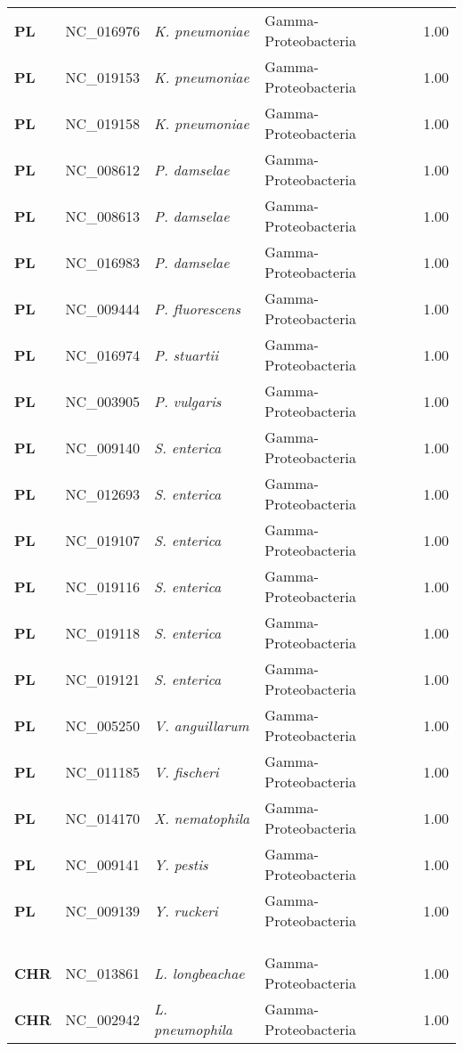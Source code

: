 \begin{adjustwidth}{-3cm}{2cm}
{\begin{supertabular}{>{\bfseries}l|p{0.1\textwidth}p{0.14\textwidth}l|l}
PL & NC\_016976 & \textit{K. pneumoniae} & Gamma-Proteobacteria & 1.00\\
PL & NC\_019153 & \textit{K. pneumoniae} & Gamma-Proteobacteria & 1.00\\
PL & NC\_019158 & \textit{K. pneumoniae} & Gamma-Proteobacteria & 1.00\\
PL & NC\_008612 & \textit{P. damselae} & Gamma-Proteobacteria & 1.00\\
PL & NC\_008613 & \textit{P. damselae} & Gamma-Proteobacteria & 1.00\\
PL & NC\_016983 & \textit{P. damselae} & Gamma-Proteobacteria & 1.00\\
PL & NC\_009444 & \textit{P. fluorescens} & Gamma-Proteobacteria & 1.00\\
PL & NC\_016974 & \textit{P. stuartii} & Gamma-Proteobacteria & 1.00\\
PL & NC\_003905 & \textit{P. vulgaris} & Gamma-Proteobacteria & 1.00\\
PL & NC\_009140 & \textit{S. enterica} & Gamma-Proteobacteria & 1.00\\
PL & NC\_012693 & \textit{S. enterica} & Gamma-Proteobacteria & 1.00\\
PL & NC\_019107 & \textit{S. enterica} & Gamma-Proteobacteria & 1.00\\
PL & NC\_019116 & \textit{S. enterica} & Gamma-Proteobacteria & 1.00\\
PL & NC\_019118 & \textit{S. enterica} & Gamma-Proteobacteria & 1.00\\
PL & NC\_019121 & \textit{S. enterica} & Gamma-Proteobacteria & 1.00\\
PL & NC\_005250 & \textit{V. anguillarum} & Gamma-Proteobacteria & 1.00\\
PL & NC\_011185 & \textit{V. fischeri} & Gamma-Proteobacteria & 1.00\\
PL & NC\_014170 & \textit{X. nematophila} & Gamma-Proteobacteria & 1.00\\
PL & NC\_009141 & \textit{Y. pestis} & Gamma-Proteobacteria & 1.00\\
PL & NC\_009139 & \textit{Y. ruckeri} & Gamma-Proteobacteria & 1.00\\
\\
\\
\hline\\
CHR & NC\_013861 & \textit{L. longbeachae} & Gamma-Proteobacteria & 1.00\\
CHR & NC\_002942 & \textit{L. pneumophila} & Gamma-Proteobacteria & 1.00\\

\end{supertabular}}
\end{adjustwidth}
